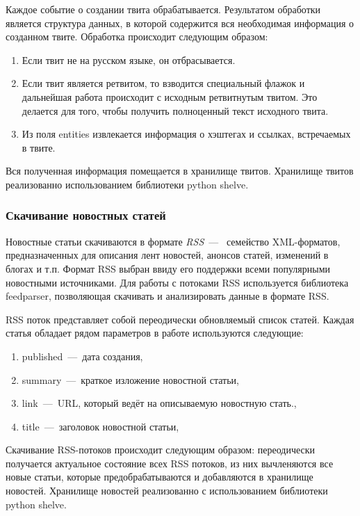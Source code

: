         Каждое событие о создании твита обрабатывается.
        Результатом обработки является структура данных, в которой содержится вся необходимая информация о созданном твите.
        Обработка происходит следующим образом:
        \begin{enumerate}
            \item Если твит не на русском языке, он отбрасывается.
            \item Если твит является ретвитом, то взводится специальный флажок и дальнейшая работа происходит с исходным ретвитнутым твитом.
            Это делается для того, чтобы получить полноценный текст исходного твита.
            \item Из поля entities извлекается информация о хэштегах и ссылках, встречаемых в твите.
        \end{enumerate}
        Вся полученная информация помещается в хранилище твитов. Хранилище твитов реализованно использованием библиотеки python shelve.

    \subsubsection{Скачивание новостных статей}
        Новостные статьи скачиваются в формате
        \textit{RSS}~---~ семейство XML-форматов, предназначенных для описания лент новостей, анонсов статей, изменений в блогах и т.п.
        Формат RSS выбран ввиду его поддержки всеми популярными новостными источниками.
        Для работы с потоками RSS используется библиотека feedparser, позволяющая скачивать и анализировать данные в формате RSS.

        RSS поток представляет собой переодически обновляемый список статей. Каждая статья обладает рядом параметров в работе используются следующие:
        \begin{enumerate}
            \item published~---~дата создания,
            \item summary~---~краткое изложение новостной статьи,
            \item link~---~URL, который ведёт на описываемую новостную стать.,
            \item title~---~заголовок новостной статьи,
        \end{enumerate}

        Скачивание RSS-потоков происходит следующим образом: переодически получается актуальное состояние всех RSS потоков, из них вычленяются все новые статьи,
        которые предобрабатываются и добавляются в хранилище новостей. Хранилище новостей реализованно с использованием библиотеки python shelve.

